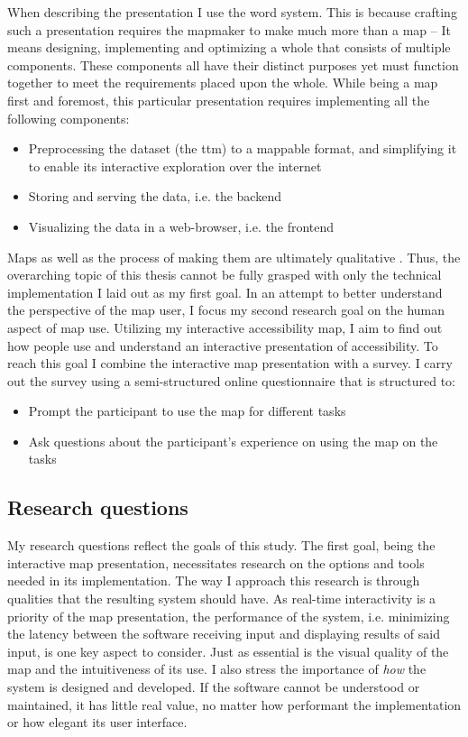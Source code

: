When describing the presentation I use the word system.
This is because crafting such a presentation
requires the mapmaker to make much more than a map --
It means designing, implementing and optimizing
a whole that consists of multiple components.
These components all have their distinct purposes yet must function together
to meet the requirements placed upon the whole.
While being a map first and foremost, this particular presentation
requires implementing all the following components:
\begin{itemize}
	\item Preprocessing the dataset (the \acrshort{ttm}) to a mappable format,
	and simplifying it to enable its interactive exploration over the internet
	\item Storing and serving the data, i.e. the backend
	\item Visualizing the data in a web-browser, i.e. the frontend
\end{itemize}

Maps as well as the process of making them are ultimately qualitative
\parencite{cop2009}.
Thus, the overarching topic of this thesis
cannot be fully grasped with only the technical implementation
I laid out as my first goal.
In an attempt to better understand the perspective of the map user,
I focus my second research goal on the human aspect of map use.
Utilizing my interactive accessibility map,
I aim to find out how
people use and understand an interactive presentation of accessibility.
To reach this goal I combine
the interactive map presentation with a survey.
I carry out the survey using a semi-structured online questionnaire
that is structured to:
\begin{itemize}
	\item Prompt the participant to use the map for different tasks
	\item Ask questions about the participant's experience
	on using the map on the tasks
\end{itemize}


\subsection{Research questions}

My research questions reflect the goals of this study.  %
The first goal, being the interactive map presentation,
necessitates research on the options and tools
needed in its implementation.
The way I approach this research is through qualities
that the resulting system should have.
As real-time interactivity is a priority of the map presentation,
the performance of the system,
i.e. minimizing the latency between
the software receiving input and displaying results of said input,
is one key aspect to consider.
Just as essential is the visual quality of the map
and the intuitiveness of its use.
I also stress the importance of
\textit{how} the system is designed and developed.
If the software cannot be understood or maintained,
it has little real value,
no matter how performant the implementation or how elegant its user interface.

